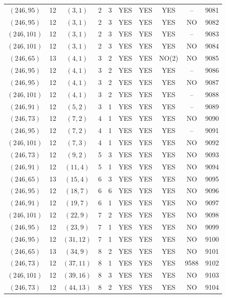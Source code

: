 \begin{longtable}{|c|c|c|c|c|c|c|c|c|c|}
$(246, 95)$ & 12 & $(3, 1)$ & 2 & 3 & YES & YES & YES & -- & 9081\\
$(246, 95)$ & 12 & $(3, 1)$ & 2 & 3 & YES & YES & YES & NO & 9082\\
$(246, 101)$ & 12 & $(3, 1)$ & 2 & 3 & YES & YES & YES & -- & 9083\\
$(246, 101)$ & 12 & $(3, 1)$ & 2 & 3 & YES & YES & YES & NO & 9084\\
$(246, 65)$ & 13 & $(4, 1)$ & 3 & 2 & YES & YES & NO(2) & NO & 9085\\
$(246, 95)$ & 12 & $(4, 1)$ & 3 & 2 & YES & YES & YES & -- & 9086\\
$(246, 95)$ & 12 & $(4, 1)$ & 3 & 2 & YES & YES & YES & NO & 9087\\
$(246, 101)$ & 12 & $(4, 1)$ & 3 & 2 & YES & YES & YES & -- & 9088\\
$(246, 91)$ & 12 & $(5, 2)$ & 3 & 1 & YES & YES & YES & -- & 9089\\
$(246, 73)$ & 12 & $(7, 2)$ & 4 & 1 & YES & YES & YES & NO & 9090\\
$(246, 95)$ & 12 & $(7, 2)$ & 4 & 1 & YES & YES & YES & -- & 9091\\
$(246, 101)$ & 12 & $(7, 3)$ & 4 & 1 & YES & YES & YES & NO & 9092\\
$(246, 73)$ & 12 & $(9, 2)$ & 5 & 3 & YES & YES & YES & NO & 9093\\
$(246, 91)$ & 12 & $(11, 4)$ & 5 & 1 & YES & YES & YES & NO & 9094\\
$(246, 65)$ & 13 & $(15, 4)$ & 6 & 3 & YES & YES & YES & NO & 9095\\
$(246, 95)$ & 12 & $(18, 7)$ & 6 & 6 & YES & YES & YES & NO & 9096\\
$(246, 91)$ & 12 & $(19, 7)$ & 6 & 1 & YES & YES & YES & NO & 9097\\
$(246, 101)$ & 12 & $(22, 9)$ & 7 & 2 & YES & YES & YES & NO & 9098\\
$(246, 95)$ & 12 & $(23, 9)$ & 7 & 1 & YES & YES & YES & NO & 9099\\
$(246, 95)$ & 12 & $(31, 12)$ & 7 & 1 & YES & YES & YES & NO & 9100\\
$(246, 65)$ & 13 & $(34, 9)$ & 8 & 2 & YES & YES & YES & NO & 9101\\
$(246, 73)$ & 12 & $(37, 11)$ & 8 & 1 & YES & YES & YES & 9588 & 9102\\
$(246, 101)$ & 12 & $(39, 16)$ & 8 & 3 & YES & YES & YES & NO & 9103\\
$(246, 73)$ & 12 & $(44, 13)$ & 8 & 2 & YES & YES & YES & NO & 9104\\

\end{longtable}
